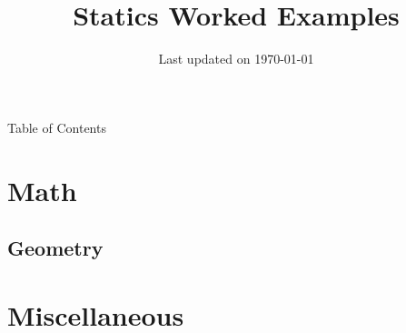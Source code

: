 \documentclass[9pt,svgnames,x11names]{beamer}
\title[\textcolor{black}{ Statics Examples }\textcolor{\thisColor}{\;2018-\the\year}]{\Huge Statics Worked Examples}
\subtitle{} %
\institute{\small Source code at: \lb{\footnotesize\url{https://github.com/dmorgorg/LaTeX2022}}}
\author{} %
\date{\small Last updated on \today}
\begin{document}

\begin{frame}[plain]
  \titlepage
\end{frame}


\begin{frame}{Table of Contents}
  \cmini[0.5]{
    \tableofcontents
  }


  \vfill

\end{frame}

\section{Math}
\subsection{Geometry}




% 


% 

\section{Miscellaneous}
\end{document}
